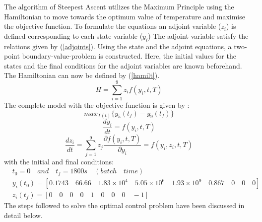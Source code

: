 \documentclass[3p,times,authoryear]{elsarticle}
\begin{document}
The algorithm of Steepest Ascent utilizes the Maximum Principle using the Hamiltonian to move towards the optimum value of temperature and maximise the objective function. To formulate the equations an adjoint variable ($z_{i}$) is defined corresponding to each state variable ($y_{i}$) The adjoint variable satisfy the relations given by (\ref{adjoints}). Using the state and the adjoint equations, a two-point boundary-value-problem is constructed. Here, the initial values for the states and the final conditions for the adjoint variables are known beforehand.
The Hamiltonian can now be defined by (\ref{hamilt}).
\begin{equation} 
H = \sum_{i = 1}^{9} z_{i}f(y_{i},t,T) \label{hamilt}
\end{equation}
The complete model with the objective function is given by :
\begin{equation} \label{obj}
max_{T(t)} \lbrace{ y_{5}(t_{f}) - y_{9}(t_{f})}\rbrace 
\end{equation}
\begin{equation}
\frac{dy_{i}}{dt} = f(y_{i},t,T) 
\end{equation}
\begin{equation} \label{adjoints}
\frac{dz_{i}}{dt} = \sum_{j=1}^{9} z_{j}\frac{\partial f(y_{i},t,T)}{\partial y_{i}} = f(y_{i},z_{i},t,T) 
\end{equation}
with the initial and final conditions:
\begin{align*}
&t_{0} = 0 \quad and \quad t_{f} = 1800s \quad(batch \quad time) \\
&y_{i}(t_{0}) = \left[ 0.1743 \quad 66.66 \quad 1.83\times10^{4}\quad 5.05\times10^{6} \quad 1.93\times10^{9} \quad 0.867 \quad 0 \quad 0 \quad 0 \right] \\
&z_{i}(t_{f}) = \left[  0 \quad 0 \quad 0 \quad 0 \quad 1 \quad 0 \quad 0 \quad 0 \quad -1 \right] 
\end{align*}
The steps followed to solve the optimal control problem have been discussed in detail below.
\end{document}
